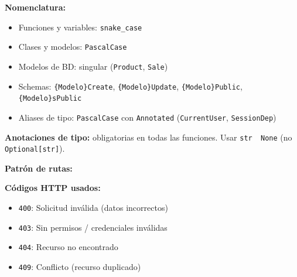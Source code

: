 \textbf{Nomenclatura:}

\begin{itemize}
\tightlist
\item
  Funciones y variables: \texttt{snake\_case}
\item
  Clases y modelos: \texttt{PascalCase}
\item
  Modelos de BD: singular (\texttt{Product}, \texttt{Sale})
\item
  Schemas: \texttt{\{Modelo\}Create}, \texttt{\{Modelo\}Update}, \texttt{\{Modelo\}Public}, \texttt{\{Modelo\}sPublic}
\item
  Aliases de tipo: \texttt{PascalCase} con \texttt{Annotated} (\texttt{CurrentUser}, \texttt{SessionDep})
\end{itemize}

\textbf{Anotaciones de tipo:} obligatorias en todas las funciones. Usar \texttt{str\ \textbar{}\ None} (no \texttt{Optional{[}str{]}}).

\textbf{Patrón de rutas:}

\begin{Shaded}
\begin{Highlighting}[]
\NormalTok{(}\OperatorTok{=}
    \OperatorTok{*}\NormalTok{,}
\NormalTok{) }\OperatorTok{{-}\textgreater{}}
\OperatorTok{=}\OperatorTok{=}\NormalTok{\{}
\end{Highlighting}
\end{Shaded}

\textbf{Códigos HTTP usados:}

\begin{itemize}
\tightlist
\item
  \texttt{400}: Solicitud inválida (datos incorrectos)
\item
  \texttt{403}: Sin permisos / credenciales inválidas
\item
  \texttt{404}: Recurso no encontrado
\item
  \texttt{409}: Conflicto (recurso duplicado)
\end{itemize}

